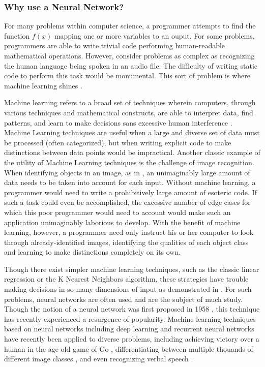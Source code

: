 \documentclass{article}
\begin{document}
\subsubsection{Why use a Neural Network?}
For many problems within computer science, a programmer attempts to find the function $f(x)$ mapping one or more variables to an ouput. For some problems, programmers are able to write trivial code performing human-readable mathematical operations. However, consider problems as complex as recognizing the human language being spoken in an audio file. The difficulty of writing static code to perform this task would be monumental. This sort of problem is where machine learning shines \cite{10algos}.

Machine learning refers to a broad set of techniques wherein computers, through various techniques and mathematical constructs, are able to interpret data, find patterns, and learn to make decisions sans excessive human interference \cite{sasml}. Machine Learning techniques are useful when a large and diverse set of data must be processed (often categorized), but when writing explicit code to make distinctions between data points would be impractical. Another classic example of the utility of Machine Learning techniques is the challenge of image recognition. When identifying objects in an image, as in \cite{hinton12}, an unimaginably large amount of data needs to be taken into account for each input. Without machine learning, a programmer would need to write a prohibitively large amount of esoteric code. If such a task could even be accomplished, the excessive number of edge cases for which this poor programmer would need to account would make such an application unimaginably laborious to develop. With the benefit of machine learning, however, a programmer need only instruct his or her computer to look through already-identified images, identifying the qualities of each object class and learning to make distinctions completely on its own.

Though there exist simpler machine learning techniques, such as the classic linear regression or the K Nearest Neighbors algorithm, these strategies have trouble making decisions in so many dimensions of input as demonstrated in \cite{knnic}. For such problems, neural networks are often used and are the subject of much study. Though the notion of a neural network was first proposed in 1958 \cite{rosenblatt58}, this technique has recently experienced a resurgence of popularity. Machine learning techniques based on neural networks including deep learning \cite{mitdeeplearning} and recurrent neural networks \cite{recurrentsurvey} have recently been applied to diverse problems, including achieving victory over a human in the age-old game of Go \cite{go1}\cite{go2}, differentiating between multiple thouands of different image classes \cite{hinton12}, and even recognizing verbal speech \cite{rnnspoken}.
\end{document}
